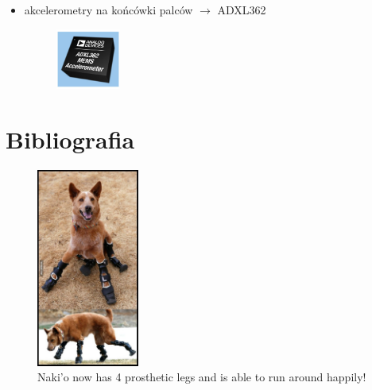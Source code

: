 \documentclass[8pt]{beamer}
\begin{document}
\begin{frame}
\begin{itemize}
\item akcelerometry na końcówki palców $\rightarrow$ ADXL362
			\begin{center}
				\begin{figure}
					\includegraphics[width=0.2\textwidth]{graphics/adxl362.jpg}
				\end{figure}
			\end{center}
\end{itemize}
\end{frame}

\section*{Bibliografia}

\begin{frame}[allowframebreaks]
	
\end{frame}
		
\begin{frame}
\begin{center}
				\begin{figure}
					\includegraphics[width=0.3\textwidth]{graphics/dog.jpg}
					\caption{Naki’o now has 4 prosthetic legs and is able to run around happily!}
				\end{figure}
			\end{center}
\end{frame}
\end{document}
